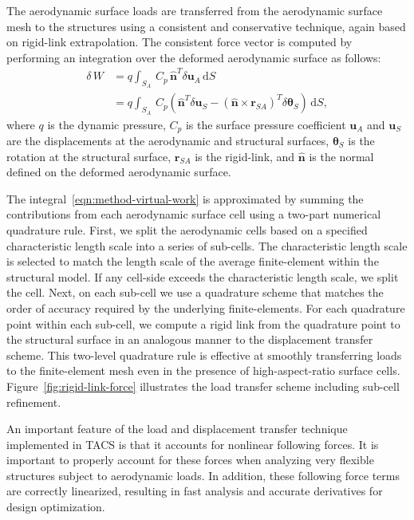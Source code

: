 \documentclass[]{aiaa-tc}
\newcommand{\mb}{\mathbf}
\newcommand{\mbs}{\boldsymbol}
\begin{document}
The aerodynamic surface loads are transferred from the aerodynamic
surface mesh to the structures using a consistent and conservative
technique, again based on rigid-link extrapolation.  The consistent
force vector is computed by performing an integration over the
deformed aerodynamic surface as follows:
\begin{equation}
  \begin{aligned}
    \delta\, W & = q \int_{S_{A}} \, C_{p} \, \hat{\mb{n}}^{T} \delta\mb{u}_{A} \, \mathrm{d}S \\
    & = q\int_{S_{A}} \, C_{p} \left( \hat{\mb{n}}^{T} \delta \mathbf{u}_{S} -
    \left( \hat{\mb{n}}\times \mb{r}_{SA} \right)^{T} \delta \mbs{\theta}_{S} \right) \, \mathrm{d}S,
  \end{aligned}
  \label{eqn:method-virtual-work}
\end{equation}
where $q$ is the dynamic pressure, $C_{p}$ is the surface pressure
coefficient $\mb{u}_{A}$ and $\mb{u}_{S}$ are the displacements at the
aerodynamic and structural surfaces, $\mbs{\theta}_{S}$ is the
rotation at the structural surface, $\mb{r}_{SA}$ is the rigid-link,
and $\hat{\mb{n}}$ is the normal defined on the deformed aerodynamic
surface.

The integral~\eqref{eqn:method-virtual-work} is approximated by
summing the contributions from each aerodynamic surface cell using a
two-part numerical quadrature rule. First, we split the aerodynamic
cells based on a specified characteristic length scale into a series
of sub-cells. The characteristic length scale is selected to match the
length scale of the average finite-element within the structural
model. If any cell-side exceeds the characteristic length scale, we
split the cell. Next, on each sub-cell we use a quadrature scheme that
matches the order of accuracy required by the underlying
finite-elements. For each quadrature point within each sub-cell, we
compute a rigid link from the quadrature point to the structural
surface in an analogous manner to the displacement transfer
scheme. This two-level quadrature rule is effective at smoothly
transferring loads to the finite-element mesh even in the presence of
high-aspect-ratio surface cells. Figure~\ref{fig:rigid-link-force}
illustrates the load transfer scheme including sub-cell refinement.

An important feature of the load and displacement transfer technique
implemented in TACS is that it accounts for nonlinear following
forces.  It is important to properly account for these forces when
analyzing very flexible structures subject to aerodynamic loads. In
addition, these following force terms are correctly linearized,
resulting in fast analysis and accurate derivatives for design
optimization.
\end{document}
